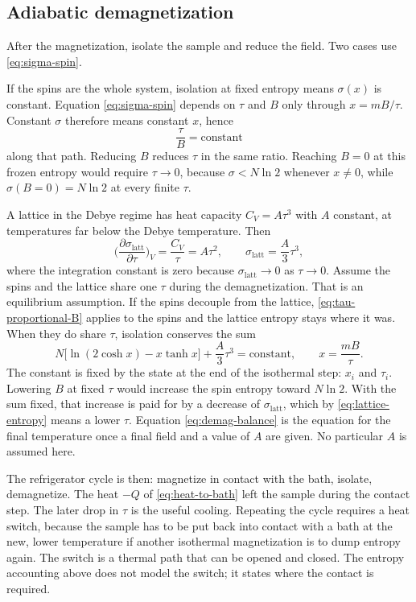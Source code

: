 \subsection{Adiabatic demagnetization}

After the magnetization, isolate the sample and reduce the field. Two cases use \eqref{eq:sigma-spin}.

If the spins are the whole system, isolation at fixed entropy means \(\sigma(x)\) is constant. Equation \eqref{eq:sigma-spin} depends on \(\tau\) and \(B\) only through \(x = mB/\tau\). Constant \(\sigma\) therefore means constant \(x\), hence
\begin{equation}
\label{eq:tau-proportional-B}
\frac{\tau}{B} = \mathrm{constant}
\end{equation}
along that path. Reducing \(B\) reduces \(\tau\) in the same ratio. Reaching \(B=0\) at this frozen entropy would require \(\tau\to 0\), because \(\sigma < N\ln 2\) whenever \(x\neq 0\), while \(\sigma(B=0) = N\ln 2\) at every finite \(\tau\).

A lattice in the Debye regime has heat capacity \(C_V = A\tau^3\) with \(A\) constant, at temperatures far below the Debye temperature. Then
\begin{equation}
\label{eq:lattice-entropy}
\biggl(\frac{\partial\sigma_{\mathrm{latt}}}{\partial\tau}\biggr)_{V}
= \frac{C_V}{\tau} = A\tau^2,
\qquad
\sigma_{\mathrm{latt}} = \frac{A}{3}\tau^3,
\end{equation}
where the integration constant is zero because \(\sigma_{\mathrm{latt}}\to 0\) as \(\tau\to 0\). Assume the spins and the lattice share one \(\tau\) during the demagnetization. That is an equilibrium assumption. If the spins decouple from the lattice, \eqref{eq:tau-proportional-B} applies to the spins and the lattice entropy stays where it was. When they do share \(\tau\), isolation conserves the sum
\begin{equation}
\label{eq:demag-balance}
N\bigl[\ln(2\cosh x) - x\tanh x\bigr] + \frac{A}{3}\tau^3
= \mathrm{constant},
\qquad
x = \frac{mB}{\tau}.
\end{equation}
The constant is fixed by the state at the end of the isothermal step: \(x_i\) and \(\tau_i\). Lowering \(B\) at fixed \(\tau\) would increase the spin entropy toward \(N\ln 2\). With the sum fixed, that increase is paid for by a decrease of \(\sigma_{\mathrm{latt}}\), which by \eqref{eq:lattice-entropy} means a lower \(\tau\). Equation \eqref{eq:demag-balance} is the equation for the final temperature once a final field and a value of \(A\) are given. No particular \(A\) is assumed here.

The refrigerator cycle is then: magnetize in contact with the bath, isolate, demagnetize. The heat \(-Q\) of \eqref{eq:heat-to-bath} left the sample during the contact step. The later drop in \(\tau\) is the useful cooling. Repeating the cycle requires a heat switch, because the sample has to be put back into contact with a bath at the new, lower temperature if another isothermal magnetization is to dump entropy again. The switch is a thermal path that can be opened and closed. The entropy accounting above does not model the switch; it states where the contact is required.
